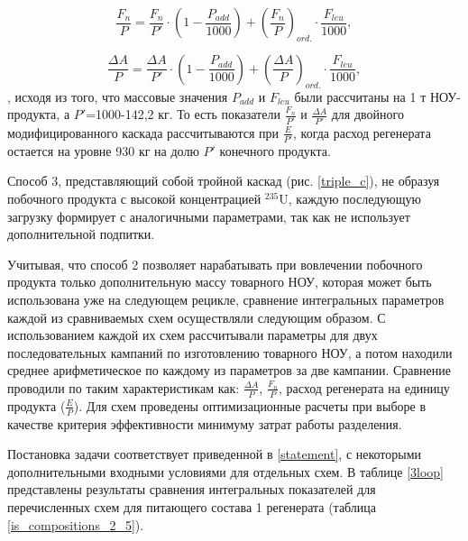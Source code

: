 \begin{equation} \label{Fnu_plus} 
    \frac{F_n}{P}=\frac{F_n}{P'}\cdot (1 - \frac{P_{add}}{1000}) + (\frac{F_n}{P})_{ord.}\cdot \frac{F_{leu}}{1000},
\end{equation} 

\begin{equation} \label{AvsP_plus} 
    \frac{\Delta A}{P}=\frac{\Delta A}{P'}\cdot (1 - \frac{P_{add}}{1000}) + (\frac{\Delta A}{P})_{ord.}\cdot \frac{F_{leu}}{1000},
\end{equation} 
, исходя из того, что массовые значения $P_{add}$ и $F_{leu}$ были рассчитаны на 1 т НОУ-продукта, а $P'$=1000-142,2 кг. То есть показатели $\frac{F_n}{P'}$ и
$\frac{\Delta A}{P'}$ для двойного модифицированного каскада рассчитываются при $\frac{E}{P'}$, когда расход регенерата остается на уровне 930 кг на долю $P'$ конечного продукта.

Способ 3, представляющий собой тройной каскад (рис. \ref{triple_c}), не образуя побочного продукта с высокой концентрацией $^{235}$U, каждую последующую загрузку формирует с аналогичными параметрами, так как не использует дополнительной подпитки.

Учитывая, что способ 2 позволяет нарабатывать при вовлечении побочного продукта только дополнительную массу товарного НОУ, которая может быть использована уже на следующем рецикле, сравнение интегральных параметров каждой из сравниваемых схем осуществляли следующим образом. С использованием каждой их схем рассчитывали параметры для двух последовательных кампаний по изготовлению товарного НОУ, а потом находили среднее арифметическое по каждому из параметров за две кампании. Сравнение проводили по таким характеристикам как: $\frac{\Delta A}{P}$, $\frac{F_n}{P}$, расход регенерата на единицу продукта ($\frac{E}{P}$). Для схем проведены оптимизационные расчеты при выборе в качестве критерия эффективности минимуму затрат работы разделения.

Постановка задачи соответствует приведенной в \ref{statement}, с некоторыми дополнительными входными условиями для отдельных схем.
В таблице \ref{3loop} представлены результаты сравнения интегральных показателей для перечисленных схем для питающего состава 1 регенерата (таблица \ref{is_compositions_2_5}).

